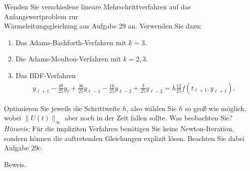 \begin{exercise}
Wenden Sie verschiedene lineare Mehrschrittverfahren auf das Anfangswertproblem zur\\
Wärmeleitungsgleichung aus Aufgabe 29 an. Verwenden Sie dazu:
\begin{enumerate}[label = \textbf{\alph*)}]
  \item Das Adams-Bashforth-Verfahren mit $k = 3$.
  \item Die Adams-Moulton-Verfahren mit $k = 2,3$.
  \item Das BDF-Verfahren
  \begin{align*}
    y_{\ell + 1} - \frac{48}{25}y_{\ell} + \frac{36}{25}y_{\ell - 1} - \frac{16}{25}y_{\ell - 2}
    + \frac{3}{25}y_{\ell - 3} = h\frac{12}{25}f(t_{\ell + 1},y_{\ell + 1}).
  \end{align*}
\end{enumerate}
Optimieren Sie jeweils die Schrittweite $h$, also wählen Sie $h$ so groß wie möglich,
wobei $\|U(t)\|_{\infty}$ aber noch in der Zeit fallen sollte. Was beobachten Sie? \\
\textit{Hinweis:} Für die impliziten Verfahren benötigen Sie keine Newton-Iteration,
sondern können die auftretenden Gleichungen explizit lösen. Beachten Sie dabei Aufgabe 29c.
\end{exercise}
\begin{solution}
Beweis.
\end{solution}
